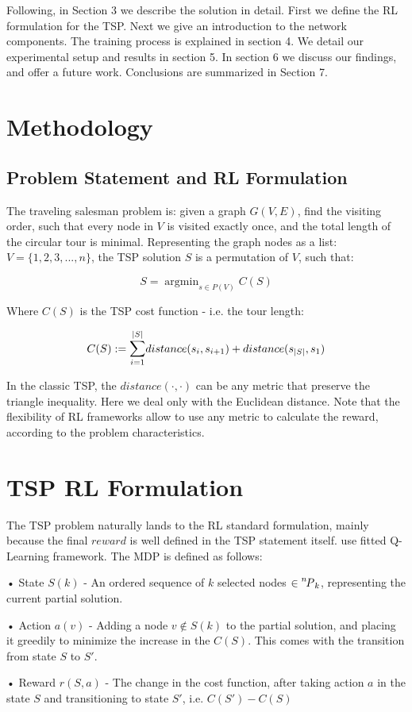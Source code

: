 \documentclass[10pt,a4paper,draft]{article}
\DeclareMathOperator*{\argmin}{argmin}
\newcommand*\perm[2][^n]{\prescript{#1\mkern-2.5mu}{}P_{#2}}
\begin{document}
Following, in Section 3 we describe the solution in detail. First we define the RL formulation for the TSP. Next we give an introduction to the network components. The training process is explained in section 4. We detail our experimental setup and results in section 5. In section 6 we discuss our findings, and offer a future work. Conclusions are summarized in Section 7.

\section{Methodology}
\subsection{Problem Statement and RL Formulation}
The traveling salesman problem is: given a graph $G(V,E)$, find the visiting order, such that every node in $V$ is visited exactly once, and the total length of the circular tour is minimal. Representing the graph nodes as a list: $V = \{1,2,3,...,n\}$, the TSP solution $S$ is a permutation of $V$, such that:

\begin{equation} \label{tsp_statement}
	S = \argmin_{s \in P(V)} C(S)
\end{equation}

Where $C(S)$ is the TSP cost function - i.e. the tour length:

\begin{equation}  \label{tsp_cost}
	C(S) := \mathlarger{\sum}_{i=1}^{|S|}{distance(s_i, s_{i+1})} + distance(s_{|S|}, s_1)
\end{equation}

In the classic TSP, the $distance(\cdot,\cdot)$ can be any metric that preserve the triangle inequality. Here we deal only with the Euclidean distance. Note that the flexibility of RL frameworks allow to use any metric to calculate the reward, according to the problem characteristics.

\section{TSP RL Formulation}	
The TSP problem naturally lands to the RL standard formulation, mainly because the final $reward$ is well defined in the TSP statement itself. 
\cite{dai17-tsp-s2v} use fitted Q-Learning framework. The MDP is defined as follows:
\begin{list}{}{}
	\item[•] State $S(k)$ - An ordered sequence of $k$ selected nodes $\in \perm[n]{k}$, representing the current partial solution.
	\item[•] Action $a(v)$ - Adding a node $v \not\in S(k)$ to the partial solution, and placing it greedily to minimize the increase in the $C(S)$. This comes with the transition from state $S$ to $S'$.
	\item[•] Reward $r(S,a)$ - The change in the cost function, after taking action $a$ in the state $S$ and transitioning to state $S'$, i.e. $C(S')-C(S)$
\end{list}
\end{document}
